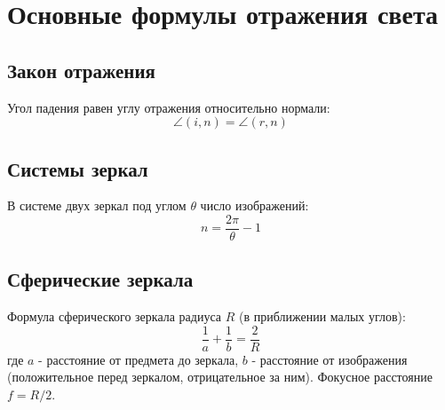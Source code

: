 \documentclass{article}
\begin{document}
\section*{Основные формулы отражения света}

\subsection*{Закон отражения}
Угол падения равен углу отражения относительно нормали:
\[
\angle(i,n)=\angle(r,n)
\]

\subsection*{Системы зеркал}
В системе двух зеркал под углом $\theta$ число изображений:
\[
n = \frac{2\pi}{\theta}-1
\]

\subsection*{Сферические зеркала}
Формула сферического зеркала радиуса $R$ (в приближении малых углов):
\[
\frac{1}{a}+\frac{1}{b}=\frac{2}{R}
\]
где $a$ - расстояние от предмета до зеркала, $b$ - расстояние от изображения (положительное перед зеркалом, отрицательное за ним). Фокусное расстояние $f=R/2$.
\end{document}
